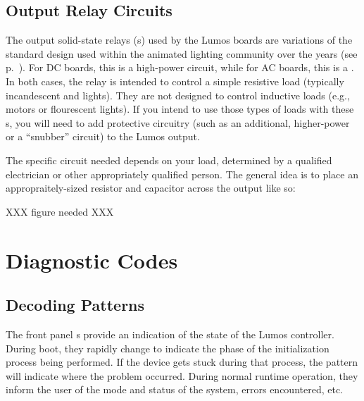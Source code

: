 \documentclass[letterpaper,twoside,onecolumn,openright,final]{memoir}
\begin{document}
\section{Output Relay Circuits}
The output solid-state relays (s) used by the Lumos boards are variations of the standard
 design used within the  animated lighting community over the years (see p.~\pageref{sec:legacy}).  For DC boards, this is a high-power  circuit, while for AC boards, this is a .
In both cases, the relay is intended to control a simple resistive load (typically incandescent and 
lights).  They are not designed to control inductive loads (e.g., motors or flourescent lights).  If you intend
to use those types of loads with these s, you will need to add protective circuitry (such as an
additional, higher-power  or a ``snubber'' circuit) to the Lumos output.

The specific circuit needed depends on your load, determined by a qualified electrician or other
appropriately qualified person.  The general idea is to place an appropraitely-sized resistor
and capacitor across the  output like so:

XXX figure needed XXX

\backmatter
\appendix

\chapter{Diagnostic Codes}
\section{Decoding  Patterns}
The front panel s provide an indication of the state of the Lumos controller.
During boot, they rapidly change to indicate the phase of the initialization process being
performed.  If the device gets stuck during that process, the  pattern will indicate
where the problem occurred.  During normal runtime operation, they inform the user of the
mode and status of the system, errors encountered, etc.
\end{document}
